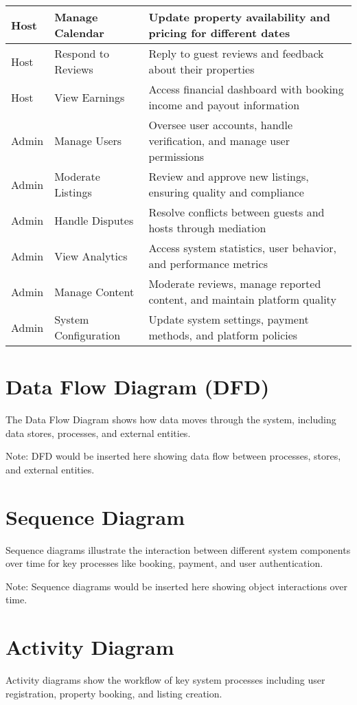 \documentclass[12pt,a4paper]{report}
\begin{document}
\begin{longtable}{|p{2.5cm}|p{4cm}|p{7.5cm}|}
\hline
Host & Manage Calendar & Update property availability and pricing for different dates \\
\hline
Host & Respond to Reviews & Reply to guest reviews and feedback about their properties \\
\hline
Host & View Earnings & Access financial dashboard with booking income and payout information \\
\hline
Admin & Manage Users & Oversee user accounts, handle verification, and manage user permissions \\
\hline
Admin & Moderate Listings & Review and approve new listings, ensuring quality and compliance \\
\hline
Admin & Handle Disputes & Resolve conflicts between guests and hosts through mediation \\
\hline
Admin & View Analytics & Access system statistics, user behavior, and performance metrics \\
\hline
Admin & Manage Content & Moderate reviews, manage reported content, and maintain platform quality \\
\hline
Admin & System Configuration & Update system settings, payment methods, and platform policies \\
\hline
\end{longtable}

\section{Data Flow Diagram (DFD)}
The Data Flow Diagram shows how data moves through the system, including data stores, processes, and external entities.

Note: DFD would be inserted here showing data flow between processes, stores, and external entities.

\section{Sequence Diagram}
Sequence diagrams illustrate the interaction between different system components over time for key processes like booking, payment, and user authentication.

Note: Sequence diagrams would be inserted here showing object interactions over time.

\section{Activity Diagram}
Activity diagrams show the workflow of key system processes including user registration, property booking, and listing creation.
\end{document}
